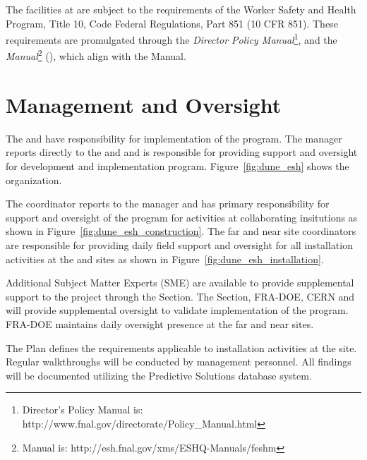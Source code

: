 The  facilities at  are subject to
the requirements of the  Worker Safety and Health Program,
Title 10, Code Federal Regulations, Part 851 (10 CFR 851). These
requirements are promulgated through the {\it \fnal Director Policy
Manual}\footnote{\fnal Director's Policy Manual is:
  http://www.fnal.gov/directorate/Policy\_Manual.html}, and the {\it \fnal
{} Manual}\footnote{\fnal {} Manual is:
  http://esh.fnal.gov/xms/ESHQ-Manuals/feshm} (), which
align with the   Manual.


\section{  Management and Oversight}

The  and  have responsibility for
implementation of the   program.  The
  manager reports directly to the
 and  and is responsible for providing
 support and oversight for development and implementation
  program. Figure~\ref{fig:dune_esh} shows
the   organization.


The   coordinator reports to the
  manager and has primary responsibility
for  support and oversight of the  
program for activities at collaborating insitutions as shown in
Figure~\ref{fig:dune_esh_construction}.  The far and near site
 coordinators are responsible for providing daily field support and
oversight for all installation activities at the 
and  sites as shown in Figure~\ref{fig:dune_esh_installation}.

Additional  Subject Matter Experts (SME) are available to
provide supplemental support to the project through the \fnal
{} Section. The \fnal {} Section, FRA-DOE, CERN and
 will provide supplemental  oversight to
validate implementation of the  
program. FRA-DOE maintains daily oversight presence at the far and
near sites.

The   Plan defines the 
requirements applicable to installation activities at the 
site. Regular  walkthroughs will be conducted by
  management personnel. All
findings will be documented utilizing the \fnal Predictive Solutions
database system.


